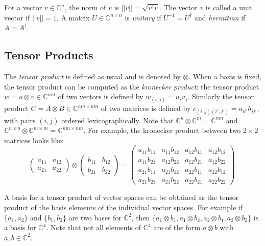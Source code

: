 \documentclass[12pt]{dalthesis}
\begin{document}
For a vector $v \in \mathbb{C}^n$, the norm of $v$ is $||v|| = \sqrt{v^\dag v}$. The vector $v$ is called a unit vector if $||v|| = 1$. A matrix $U \in \mathbb{C}^{n \times n}$ is \emph{unitary} if $U^{-1} = U^\dag$ and \emph{hermitian} if  $A = A^\dag$.

\subsection{Tensor Products}
\label{tensor products}
The \emph{tensor product} is defined as usual and is denoted by $\otimes$. When a basis is fixed, the tensor product can be computed as the \emph{kronecker product}: the tensor product $w = u \otimes v \in \mathbb{C}^{nm}$ of two vectors is defined by $w_{(i, j)} = u_iv_j$. Similarly the tensor product $C = A \otimes B \in \mathbb{C}^{nm \times nm}$ of two matrices is defined by $c_{(i, j)(i', j')} = a_{ii'}b_{jj'}$, with pairs $(i, j)$ ordered lexicographically. Note that $\mathbb{C}^n \otimes \mathbb{C}^m = \mathbb{C}^{nm}$ and $\mathbb{C}^{n \times n} \otimes \mathbb{C}^{m \times m} = \mathbb{C}^{nm \times nm}$. For example, the kronecker product between two $2 \times 2$ matrices looks like:
\begin{equation*}
\begin{pmatrix}
a_{11} & a_{12} \\
a_{21} & a_{22} 
\end{pmatrix} 
\otimes 
\begin{pmatrix}
b_{11} & b_{12} \\
b_{21} & b_{22} 
\end{pmatrix} 
=
\begin{pmatrix}
a_{11}b_{11} & a_{11}b_{12} & a_{12}b_{11} & a_{12}b_{12} \\
a_{11}b_{21} & a_{12}b_{22} & a_{12}b_{21} & a_{12}b_{22} \\
a_{21}b_{11} & a_{21}b_{12} & a_{22}b_{11} & a_{22}b_{12} \\
a_{21}b_{21} & a_{21}b_{22} & a_{22}b_{21} & a_{22}b_{22}
\end{pmatrix}.
\end{equation*}


A basis for a tensor product of vector spaces can be obtained as the tensor product of the basis elements of the individual vector spaces. For example if $\{ a_1, a_2 \}$ and $\{ b_1 , b_2  \}$ are two bases for $\mathbb{C}^2$, then $\{ a_1 \otimes b_1, a_1 \otimes b_2, a_2 \otimes b_1, a_2 \otimes b_2 \}$ is a basis for $\mathbb{C}^4$. Note that not all elements of $\mathbb{C}^4$ are of the form $a \otimes b$ with $a, b \in \mathbb{C}^2$.
\end{document}
